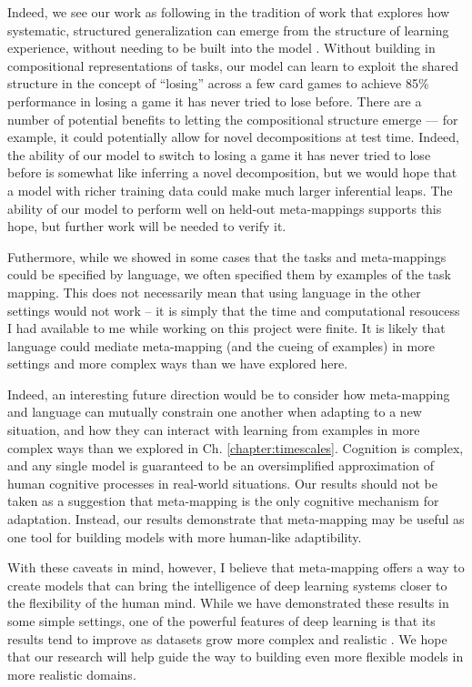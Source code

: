 Indeed, we see our work as following in the tradition of work that explores how systematic, structured generalization can emerge from the structure of learning experience, without needing to be built into the model \citep{McClelland2010a, McClelland2010, Hansen2017}. Without building in compositional representations of tasks, our model can learn to exploit the shared structure in the concept of ``losing'' across a few card games to achieve 85\% performance in losing a game it has never tried to lose before. There are a number of potential benefits to letting the compositional structure emerge --- for example, it could potentially allow for novel decompositions at test time. Indeed, the ability of our model to switch to losing a game it has never tried to lose before is somewhat like inferring a novel decomposition, but we would hope that a model with richer training data could make much larger inferential leaps. The ability of our model to perform well on held-out meta-mappings supports this hope, but further work will be needed to verify it. \par

Futhermore, while we showed in some cases that the tasks and meta-mappings could be specified by language, we often specified them by examples of the task mapping. This does not necessarily mean that using language in the other settings would not work -- it is simply that the time and computational resoucess I had available to me while working on this project were finite. It is likely that language could mediate meta-mapping (and the cueing of examples) in more settings and more complex ways than we have explored here.\par 

Indeed, an interesting future direction would be to consider how meta-mapping and language can mutually constrain one another when adapting to a new situation, and how they can interact with learning from examples in more complex ways than we explored in Ch. \ref{chapter:timescales}. Cognition is complex, and any single model is guaranteed to be an oversimplified approximation of human cognitive processes in real-world situations. Our results should not be taken as a suggestion that meta-mapping is the only cognitive mechanism for adaptation. Instead, our results demonstrate that meta-mapping may be useful as one tool for building models with more human-like adaptibility. \par

With these caveats in mind, however, I believe that meta-mapping offers a way to create models that can bring the intelligence of deep learning systems closer to the flexibility of the human mind. While we have demonstrated these results in some simple settings, one of the powerful features of deep learning is that its results tend to improve as datasets grow more complex and realistic \citep{Hill2019a,Radford2019}. We hope that our research will help guide the way to building even more flexible models in more realistic domains.  \par

